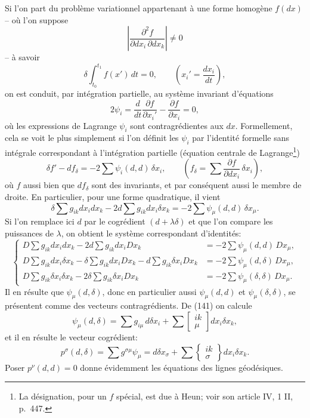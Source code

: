\documentclass[11pt]{article}
\begin{document}
Si l'on part du problème variationnel appartenant à une forme homogène $f(dx)$ -- où l'on suppose
\[
\left|\frac{\partial^2 f}{\partial dx_i\,\partial dx_k}\right|\ne0
\]
-- à savoir
\begin{equation}
 \delta\int_{t_0}^{t_1} f(x')\,dt=0,
 \qquad \left(x_i'=\frac{dx_i}{dt}\right),
\tag{140}
\end{equation}
on est conduit, par intégration partielle, au système invariant d'équations
\[
 2\psi_i=\frac{d}{dt}\frac{\partial f}{\partial x_i'}-\frac{\partial f}{\partial x_i}=0,
\]
où les expressions de Lagrange $\psi_i$ sont contragrédientes aux $dx$. Formellement, cela se voit le plus simplement si l'on définit les $\psi_i$ par l'identité formelle sans intégrale correspondant à l'intégration partielle (équation centrale de Lagrange\footnote{La désignation, pour un $f$ spécial, est due à Heun; voir son article IV, 1 II, p.~447.})
\[
 \delta f'-df_\delta=-2\sum\psi_i(d,d)\,\delta x_i,
 \qquad
 \left(f_\delta=\sum\frac{\partial f}{\partial dx_i}\,\delta x_i\right),
\]
où $f$ aussi bien que $df_\delta$ sont des invariants, et par conséquent aussi le membre de droite. En particulier, pour une forme quadratique, il vient
\[
 \delta\sum g_{ik}dx_i dx_k-2d\sum g_{ik}dx_i\delta x_k
 =-2\sum\psi_\mu(d,d)\,\delta x_\mu.
\]
Si l'on remplace ici $d$ par le cogrédient $(d+\lambda\delta)$ et que l'on compare les puissances de $\lambda$, on obtient le système correspondant d'identités:
\begin{equation}
\left\{
\begin{aligned}
D\sum g_{ik}dx_i dx_k-2d\sum g_{ik}dx_iDx_k
   &=-2\sum\psi_\mu(d,d)\,Dx_\mu,\\
D\sum g_{ik}dx_i\delta x_k-\delta\sum g_{ik}dx_iDx_k
   -d\sum g_{ik}\delta x_iDx_k
   &=-2\sum\psi_\mu(d,\delta)\,Dx_\mu,\\
D\sum g_{ik}\delta x_i\delta x_k-2\delta\sum g_{ik}\delta x_iDx_k
   &=-2\sum\psi_\mu(\delta,\delta)\,Dx_\mu.
\end{aligned}
\right.
\tag{141}
\end{equation}
Il en résulte que $\psi_\mu(d,\delta)$, donc en particulier aussi $\psi_\mu(d,d)$ et $\psi_\mu(\delta,\delta)$, se présentent comme des vecteurs contragrédients. De (141) on calcule
\[
 \psi_\mu(d,\delta)=\sum g_{i\mu}\,d\delta x_i+
 \sum\left[\begin{smallmatrix}ik\\ \mu\end{smallmatrix}\right]dx_i\delta x_k,
\]
et il en résulte le vecteur cogrédient:
\begin{equation}
 p^\sigma(d,\delta)=\sum g^{\sigma\mu}\psi_\mu
 =d\delta x_\sigma+
 \sum\left\{\begin{smallmatrix}ik\\ \sigma\end{smallmatrix}\right\}dx_i\delta x_k.
\tag{142}
\end{equation}
Poser $p^\nu(d,d)=0$ donne évidemment les équations des lignes géodésiques.
\end{document}
